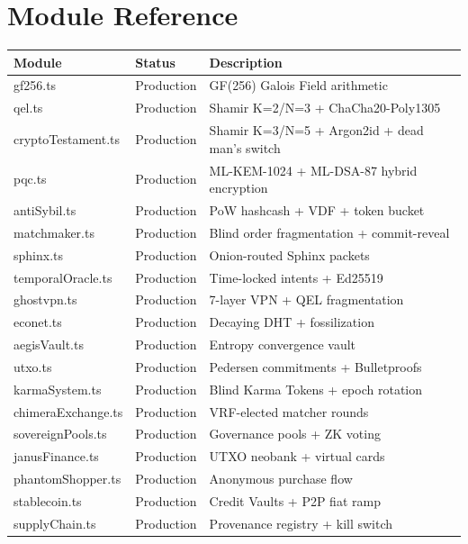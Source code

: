 \documentclass[11pt,a4paper]{article}
\begin{document}
\section{Module Reference}

\begin{table}[h]
\centering
\small
\begin{tabular}{@{}lll@{}}
\toprule
\textbf{Module} & \textbf{Status} & \textbf{Description} \\
\midrule
gf256.ts & Production & GF(256) Galois Field arithmetic \\
qel.ts & Production & Shamir K=2/N=3 + ChaCha20-Poly1305 \\
cryptoTestament.ts & Production & Shamir K=3/N=5 + Argon2id + dead man's switch \\
pqc.ts & Production & ML-KEM-1024 + ML-DSA-87 hybrid encryption \\
antiSybil.ts & Production & PoW hashcash + VDF + token bucket \\
matchmaker.ts & Production & Blind order fragmentation + commit-reveal \\
sphinx.ts & Production & Onion-routed Sphinx packets \\
temporalOracle.ts & Production & Time-locked intents + Ed25519 \\
ghostvpn.ts & Production & 7-layer VPN + QEL fragmentation \\
econet.ts & Production & Decaying DHT + fossilization \\
aegisVault.ts & Production & Entropy convergence vault \\
utxo.ts & Production & Pedersen commitments + Bulletproofs \\
karmaSystem.ts & Production & Blind Karma Tokens + epoch rotation \\
chimeraExchange.ts & Production & VRF-elected matcher rounds \\
sovereignPools.ts & Production & Governance pools + ZK voting \\
janusFinance.ts & Production & UTXO neobank + virtual cards \\
phantomShopper.ts & Production & Anonymous purchase flow \\
stablecoin.ts & Production & Credit Vaults + P2P fiat ramp \\
supplyChain.ts & Production & Provenance registry + kill switch \\

\end{tabular}
\end{table}
\end{document}
